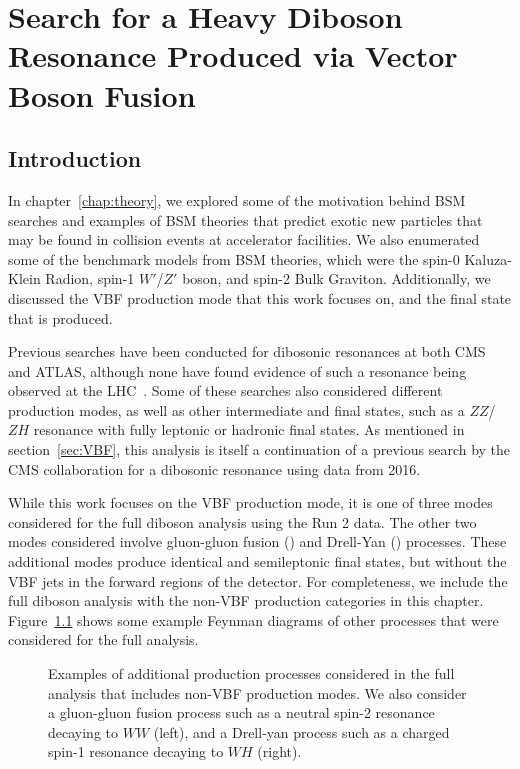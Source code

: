
\chapter{Search for a Heavy Diboson Resonance Produced via Vector Boson Fusion}
\label{chap:analysis}

\section{Introduction}

In chapter~\ref{chap:theory}, we explored some of the motivation behind BSM searches and examples of BSM theories that predict exotic new particles that may be found in collision events at accelerator facilities.
We also enumerated some of the benchmark models from BSM theories, which were the spin-0 Kaluza-Klein Radion, spin-1 $W'$/$Z'$ boson, and spin-2 Bulk Graviton.
Additionally, we discussed the VBF production mode that this work focuses on, and the final state that is produced.

Previous searches have been conducted for dibosonic resonances at both CMS and ATLAS, although none have found evidence of such a resonance being observed at the LHC~\cite{Sirunyan_18,Aaboud_18,Aaboud_18_2,Aad_15,Khachatryan_14,Sirunyan_17,Sirunyan_17_2,atlas20}.
Some of these searches also considered different production modes, as well as other intermediate and final states, such as a $ZZ$/$ZH$ resonance with fully leptonic or hadronic final states.
As mentioned in section~\ref{sec:VBF}, this analysis is itself a continuation of a previous search by the CMS collaboration for a dibosonic resonance using data from 2016.

While this work focuses on the VBF production mode, it is one of three modes considered for the full diboson analysis using the Run 2 data.
The other two modes considered involve gluon-gluon fusion (\ggF) and Drell-Yan (\DY) processes.
These additional modes produce identical \lnuqqbarprp and \lnubbbar semileptonic final states, but without the VBF jets in the forward regions of the detector.
For completeness, we include the full diboson analysis with the non-VBF production categories in this chapter.
Figure~\ref{fig:nonVbf} shows some example Feynman diagrams of other processes that were considered for the full analysis.

\begin{figure}[htbp]
  \centering
  
  \caption{
    Examples of additional production processes considered in the full analysis that includes non-VBF production modes.
    We also consider a gluon-gluon fusion process such as a neutral spin-2 resonance decaying to $WW$ (left), and a Drell-yan process such as a charged spin-1 resonance decaying to $WH$ (right).
  }
  \label{fig:nonVbf}
\end{figure}

